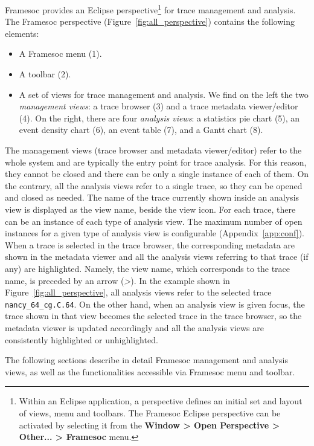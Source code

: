 \documentclass[twoside]{article}
\begin{document}
\begin{sloppypar}
Framesoc provides an Eclipse perspective\footnote{Within an Eclipse application, a perspective defines an initial set and layout of views, menu and toolbars. The Framesoc Eclipse perspective can be activated by selecting it from the \textbf{Window > Open Perspective > Other... > Framesoc} menu.} for trace management and analysis.
The Framesoc perspective (Figure~\ref{fig:all_perspective}) contains the following elements:
\begin{itemize}
 \item A Framesoc menu (\num{1}).
 \item A toolbar (\num{2}).
 \item A set of views for trace management and analysis. We find on the left the two \emph{management views}: a trace browser (\num{3}) and a trace metadata viewer/editor (\num{4}). On the right, there are four \emph{analysis views}: a statistics pie chart (\num{5}), an event density chart (\num{6}), an event table (\num{7}), and a Gantt chart (\num{8}). 
\end{itemize}

The management views (trace browser and metadata viewer/editor) refer to the whole system and are typically the entry point for trace analysis.
For this reason, they cannot be closed and there can be only a single instance of each of them.
On the contrary, all the analysis views refer to a single trace, so they can be opened and closed as needed. 
The name of the trace currently shown inside an analysis view is displayed as the view name, beside the view icon.
For each trace, there can be an instance of each type of analysis view. 
The maximum number of open instances for a given type of analysis view is configurable (Appendix~\ref{app:conf}).
When a trace is selected in the trace browser, the corresponding metadata are shown in the metadata viewer and all the analysis views referring to that trace (if any) are highlighted. 
Namely, the view name, which corresponds to the trace name, is preceded by an arrow (\emph{>}). 
In the example shown in Figure~\ref{fig:all_perspective}, all analysis views refer to the selected trace \texttt{nancy\_64\_cg.C.64}.
On the other hand, when an analysis view is given focus, the trace shown in that view becomes the selected trace in the trace browser, so the metadata viewer is updated accordingly and all the analysis views are consistently highlighted or unhighlighted. 

The following sections describe in detail Framesoc management and analysis views, as well as the functionalities accessible via Framesoc menu and toolbar.


\end{sloppypar}
\end{document}
